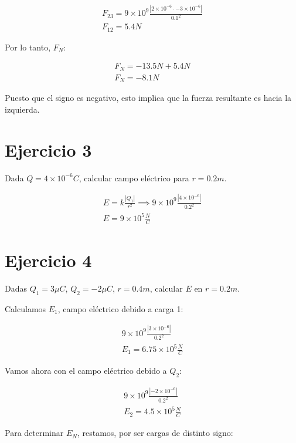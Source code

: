 \begin{align*}
    F_{23} = 9 \times 10^{9} \frac{|2 \times 10^{-6} \cdot -3 \times 10^{-6}|}{0.1^{2}} \\
    \boxed{F_{12} = 5.4 N}
\end{align*}

Por lo tanto, \(F_{N}\):

\begin{align*}
    F_{N} = -13.5 N + 5.4 N \\
    \boxed{F_{N} = -8.1 N}
\end{align*}

Puesto que el signo es negativo,
esto implica que la fuerza resultante es hacia la izquierda.

\section{Ejercicio 3}

Dada \(Q = 4 \times 10^{-6} C\), calcular campo eléctrico para 
\(r = 0.2m\).

\begin{align*}
    E = k\frac{|Q_1|}{r^{2}} \implies 9 \times 10^{9} \frac{|4 \times 10^{-6}|}{0.2^{2}} \\
    \boxed{E = 9 \times 10^{5} \frac{N}{C}}
\end{align*}

\section{Ejercicio 4}

Dadas \(Q_1 = 3 \mu C\), \(Q_2 = -2 \mu C\), \(r = 0.4 m\), calcular \(E\) en \(r = 0.2 m\).

Calculamos \(E_1\), campo eléctrico debido a carga 1:

\begin{align*}
    9 \times 10^{9} \frac{|3 \times 10^{-6}|}{0.2^{2}} \\
    \boxed{E_1 = 6.75 \times 10^{5} \frac{N}{C}}
\end{align*}

Vamos ahora con el campo eléctrico debido a \(Q_2\):

\begin{align*}
    9 \times 10^{9} \frac{|-2 \times 10^{-6}|}{0.2^{2}} \\
    \boxed{E_2 = 4.5 \times 10^{5} \frac{N}{C}}
\end{align*}

Para determinar \(E_N\), restamos, por ser cargas de distinto signo:


